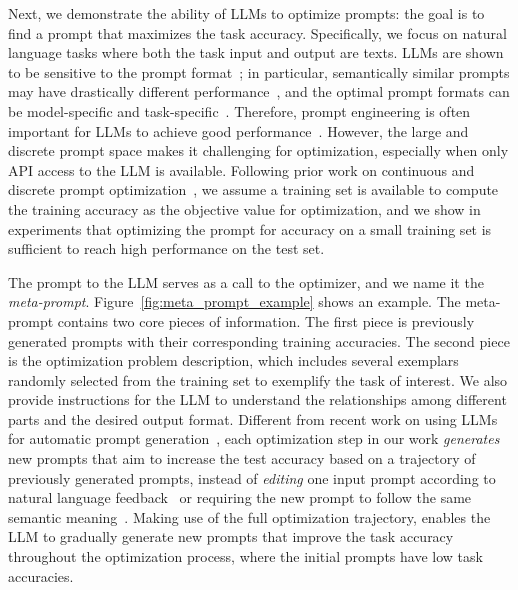 Next, we demonstrate the ability of LLMs to optimize prompts: the goal is to find a prompt that maximizes the task accuracy. 
Specifically, we focus on natural language tasks where both the task input and output are texts. 
LLMs are shown to be sensitive to the prompt format~\citep{zhao2021calibrate,lu2021fantastically,wei2023larger,madaan2022text}; in particular, semantically similar prompts may have drastically different performance~\citep{kojima2022large,zhou2022large,zhang2022tempera}, and the optimal prompt formats can be model-specific and task-specific~\citep{ma2023let,chen2023you}.
Therefore, prompt engineering is often important for LLMs to achieve good performance~\citep{reynolds2021prompt}.
However, the large and discrete prompt space makes it challenging for optimization, especially when only API access to the LLM is available. 
Following prior work on continuous and discrete prompt optimization~\citep{lester2021power,li2021prefix,zhou2022large,pryzant2023automatic}, we assume a training set is available to compute the training accuracy as the objective value for optimization, and we show in experiments that optimizing the prompt for accuracy on a small training set is sufficient to reach high performance on the test set.

The prompt to the LLM serves as a call to the optimizer, and we name it the \emph{meta-prompt}. 
Figure~\ref{fig:meta_prompt_example} shows an example.
The meta-prompt contains two core pieces of information.
The first piece is previously generated prompts with their corresponding training accuracies. 
The second piece is the optimization problem description, which includes several exemplars randomly selected from the training set to exemplify the task of interest.
We also provide instructions for the LLM to understand the relationships among different parts and the desired output format.
Different from recent work on using LLMs for automatic prompt generation~\citep{zhou2022large,pryzant2023automatic}, each optimization step in our work \emph{generates} new prompts that aim to increase the test accuracy based on a trajectory of previously generated prompts, instead of \emph{editing} one input prompt according to natural language feedback~\citep{pryzant2023automatic} or requiring the new prompt to follow the same semantic meaning~\citep{zhou2022large}.
Making use of the full optimization trajectory, \name{} enables the LLM to gradually generate new prompts that improve the task accuracy throughout the optimization process, where the initial prompts have low task accuracies.

